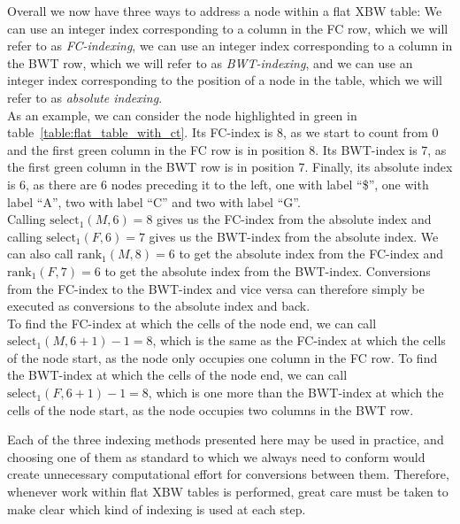 \documentclass[a4paper,12pt,twoside,BCOR=10mm]{scrbook}
\begin{document}
Overall we now have three ways to address a node within a flat XBW table:
We can use an integer index corresponding to a column in the FC row,
which we will refer to as \textit{FC-indexing}\label{def:fc_indexing},
we can use an integer index corresponding to a column in the BWT row,
which we will refer to as \textit{BWT-indexing}\label{def:bwt_indexing},
and we can use an integer index corresponding to the position of a node in the table,
which we will refer to as \textit{absolute indexing}\label{def:absolute_indexing}. \\
As an example, we can consider the node highlighted in green in table~\ref{table:flat_table_with_ct}.
Its FC-index is 8, as we start to count from 0 and the first green column in the FC row is in position 8.
Its BWT-index is 7, as the first green column in the BWT row is in position 7.
Finally, its absolute index is 6, as there are 6 nodes preceding it to the left, one
with label “\$”, one with label “A”, two with label “C” and two with label “G”. \\
Calling $ \textrm{select}_1 ( M, 6 ) \boldsymbol{=} 8 $ gives us the FC-index from the absolute index and
calling $ \textrm{select}_1 ( F, 6 ) \boldsymbol{=} 7 $ gives us the BWT-index from the absolute index.
We can also call $ \textrm{rank}_1 ( M, 8 ) \boldsymbol{=} 6 $ to get the absolute index from the FC-index
and $ \textrm{rank}_1 ( F, 7 ) \boldsymbol{=} 6 $ to get the absolute index from the BWT-index.
Conversions from the FC-index to the BWT-index and vice versa can therefore simply be executed as conversions
to the absolute index and back. \\
To find the FC-index at which the cells of the node end,
we can call $ \textrm{select}_1 ( M, 6 + 1 ) - 1 \boldsymbol{=} 8 $, which
is the same as the FC-index at which the cells of the node start, as the node
only occupies one column in the FC row.
To find the BWT-index at which the cells of the node end,
we can call $ \textrm{select}_1 ( F, 6 + 1 ) - 1 \boldsymbol{=} 8 $, which
is one more than the BWT-index at which the cells of the node start,
as the node occupies two columns in the BWT row.

Each of the three indexing methods presented here
may be used in practice, and choosing one of them as standard to which
we always need to conform would create unnecessary computational effort for conversions
between them.
Therefore, whenever work within flat XBW tables is performed, great care must be taken
to make clear which kind of indexing is used at each step.
\end{document}
